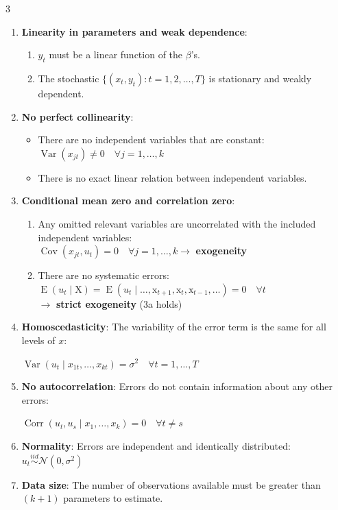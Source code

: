 \documentclass[10pt, a4paper, landscape]{article}
\DeclareMathOperator{\E}{E}
\DeclareMathOperator{\Var}{Var}
\DeclareMathOperator{\Cov}{Cov}
\DeclareMathOperator{\Corr}{Corr}
\begin{document}
\begin{multicols}{3}
\begin{enumerate}[leftmargin=*, label=t\arabic{*}.]
	\item \textbf{Linearity in parameters and weak dependence}:
	\begin{enumerate}[leftmargin=*, label=\alph{*}.]
		\item \( y_{t} \) must be a linear function of the \( \beta \)'s.
		\item The stochastic \( \lbrace (x_{t}, y_{t}) : t = 1, 2, \ldots, T \rbrace \) is stationary and weakly dependent.
	\end{enumerate}
	\item \textbf{No perfect collinearity}:
	\begin{itemize}[leftmargin=*]
		\item There are no independent variables that are constant: \( \Var(x_{jt}) \neq 0 \quad \forall j = 1, \ldots, k \)
		\item There is no exact linear relation between independent variables.
	\end{itemize}
	\item \textbf{Conditional mean zero and correlation zero}:
	\begin{enumerate}[leftmargin=*, label=\alph{*}.]
		\item Any omitted relevant variables are uncorrelated with the included independent variables: \\
		\( \Cov(x_{jt} , u_{t}) = 0 \quad \forall j = 1, \ldots, k \rightarrow \) \textbf{exogeneity}
		\item There are no systematic errors: \\
		\( \E(u_{t} \mid \mathrm{X}) = \E(u_{t} \mid \ldots, \mathrm{x}_{t+1}, \mathrm{x}_{t}, \mathrm{x}_{t-1}, \ldots) = 0 \quad \forall t \) \\
		\( \rightarrow \) \textbf{strict exogeneity} (3a holds)
	\end{enumerate}
	\item \textbf{Homoscedasticity}: The variability of the error term is the same for all levels of \( x \):
	\begin{center}
		\( \Var(u_{t} \mid x_{1t}, \ldots, x_{kt}) = \sigma^{2} \quad \forall t = 1, \ldots, T \)
	\end{center}
	\item \textbf{No autocorrelation}: Errors do not contain information about any other errors:
	\begin{center}
		\( \Corr(u_{t}, u_{s} \mid x_{1}, \ldots, x_{k}) = 0 \quad \forall t \neq s \)
	\end{center}
	\item \textbf{Normality}: Errors are independent and identically distributed: \( u_{t} \overset{iid}{\sim} \mathcal{N} (0, \sigma^{2}) \)
	\item \textbf{Data size}: The number of observations available must be greater than \( (k + 1) \) parameters to estimate.
\end{enumerate}


\end{multicols}
\end{document}
